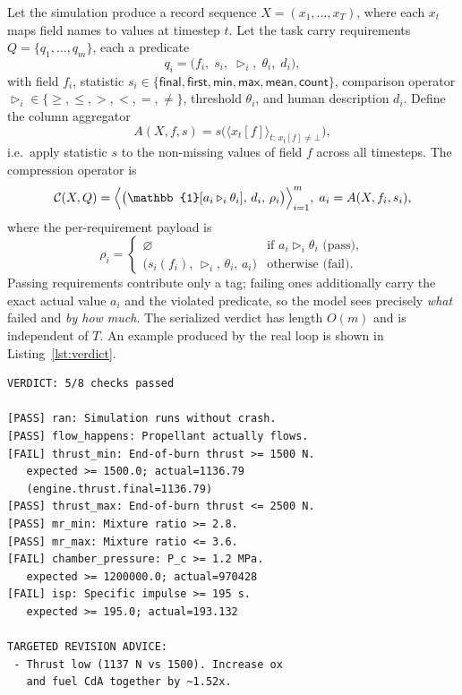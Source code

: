 \documentclass[10pt,twocolumn]{article}
\begin{document}
Let the simulation produce a record sequence $X=(x_1,\dots,x_T)$, where each $x_t$
maps field names to values at timestep $t$. Let the task carry requirements
$Q=\{q_1,\dots,q_m\}$, each a predicate
\[
q_i=\bigl(f_i,\; s_i,\; \triangleright_i,\; \theta_i,\; d_i\bigr),
\]
with field $f_i$, statistic
$s_i\in\{\textsf{final},\textsf{first},\textsf{min},\textsf{max},\textsf{mean},\textsf{count}\}$,
comparison operator $\triangleright_i\in\{\ge,\le,>,<,=,\ne\}$, threshold $\theta_i$,
and human description $d_i$. Define the column aggregator
\[
A(X,f,s)=s\bigl(\langle x_t[f]\rangle_{t:\,x_t[f]\neq\bot}\bigr),
\]
i.e.\ apply statistic $s$ to the non-missing values of field $f$ across all
timesteps. The compression operator is
\[
\mathcal{C}(X,Q)=\Bigl\langle \bigl(\mathbb{1}[a_i \triangleright_i \theta_i],\,
d_i,\, \rho_i\bigr)\Bigr\rangle_{i=1}^{m},\; a_i=A(X,f_i,s_i),
\]
where the per-requirement payload is
\[
\rho_i=\begin{cases}
\varnothing & \text{if } a_i \triangleright_i \theta_i \text{ (pass)},\\[2pt]
\bigl(s_i(f_i),\,\triangleright_i,\,\theta_i,\,a_i\bigr) & \text{otherwise (fail)}.
\end{cases}
\]
Passing requirements contribute only a tag; failing ones additionally carry the
exact actual value $a_i$ and the violated predicate, so the model sees precisely
\emph{what} failed and \emph{by how much}. The serialized verdict has length
$O(m)$ and is independent of $T$. An example produced by the real loop is shown in
Listing~\ref{lst:verdict}.

\begin{lstlisting}[style=verd,caption={A real verdict for one iteration of the
\texttt{lox\_methane\_engine} spec (8 checks). The raw simulator output for this
same iteration is $\approx\!198\mathrm{k}$ tokens; this verdict is $433$.},
label={lst:verdict},escapechar=!]
VERDICT: 5/8 checks passed

[PASS] ran: Simulation runs without crash.
[PASS] flow_happens: Propellant actually flows.
[FAIL] thrust_min: End-of-burn thrust >= 1500 N.
   expected >= 1500.0; actual=1136.79
   (engine.thrust.final=1136.79)
[PASS] thrust_max: End-of-burn thrust <= 2500 N.
[PASS] mr_min: Mixture ratio >= 2.8.
[PASS] mr_max: Mixture ratio <= 3.6.
[FAIL] chamber_pressure: P_c >= 1.2 MPa.
   expected >= 1200000.0; actual=970428
[FAIL] isp: Specific impulse >= 195 s.
   expected >= 195.0; actual=193.132

TARGETED REVISION ADVICE:
 - Thrust low (1137 N vs 1500). Increase ox
   and fuel CdA together by ~1.52x.
\end{lstlisting}
\end{document}
